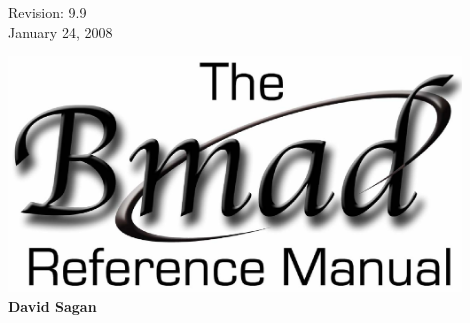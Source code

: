 \thispagestyle{empty}

\begin{flushright}
\large
  Revision: 9.9 \\
  January 24, 2008 \\
\end{flushright}

\vfill

{
\begin{center}
\includegraphics[width=12cm]{bmad-ref-manual.eps} \\
\vskip 0.3in
\huge\bf David Sagan
\end{center}
}

\vfill
\break

